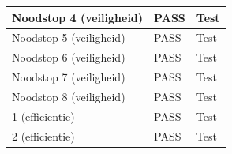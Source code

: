 \documentclass{article}
\begin{document}
\begin{tabular}{ |p{4cm}||p{2cm}|p{5cm}|}
            Noodstop 4 (veiligheid)             &           \leavevmode\color[HTML]{32CD32} PASS          &         Test        \\ \hline
            Noodstop 5 (veiligheid)             &           \leavevmode\color[HTML]{32CD32} PASS          &         Test        \\ \hline
            Noodstop 6 (veiligheid)             &           \leavevmode\color[HTML]{32CD32} PASS          &         Test        \\ \hline
            Noodstop 7 (veiligheid)             &           \leavevmode\color[HTML]{32CD32} PASS          &         Test        \\ \hline
            Noodstop 8 (veiligheid)             &           \leavevmode\color[HTML]{32CD32} PASS          &         Test        \\ \hline
            1 (efficientie)                     &           \leavevmode\color[HTML]{32CD32} PASS          &         Test        \\ \hline
            2 (efficientie)                     &           \leavevmode\color[HTML]{32CD32} PASS          &         Test        \\ \hline
        \hline
    \end{tabular}





\newpage


\end{document}
